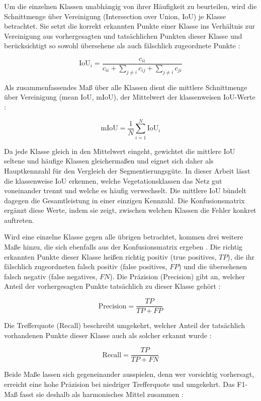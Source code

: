 Um die einzelnen Klassen unabhängig von ihrer Häufigkeit zu beurteilen, wird die Schnittmenge über Vereinigung (Intersection over Union, IoU) je Klasse betrachtet. Sie setzt die korrekt erkannten Punkte einer Klasse ins Verhältnis zur Vereinigung aus vorhergesagten und tatsächlichen Punkten dieser Klasse und berücksichtigt so sowohl übersehene als auch fälschlich zugeordnete Punkte \cite{Diab.2022}:

\[
    \mathrm{IoU}_i = \frac{c_{ii}}{c_{ii} + \sum_{j \neq i} c_{ij} + \sum_{j \neq i} c_{ji}}
\]

Als zusammenfassendes Maß über alle Klassen dient die mittlere Schnittmenge über Vereinigung (mean IoU, mIoU), der Mittelwert der klassenweisen IoU-Werte \cite{Diab.2022}:

\[
    \mathrm{mIoU} = \frac{1}{N} \sum_{i=1}^{N} \mathrm{IoU}_i
\]

Da jede Klasse gleich in den Mittelwert eingeht, gewichtet die mittlere IoU seltene und häufige Klassen gleichermaßen und eignet sich daher als Hauptkennzahl für den Vergleich der Segmentierungsgüte. In dieser Arbeit lässt die klassenweise IoU erkennen, welche Vegetationsklassen das Netz gut voneinander trennt und welche es häufig verwechselt. Die mittlere IoU bündelt dagegen die Gesamtleistung in einer einzigen Kennzahl. Die Konfusionsmatrix ergänzt diese Werte, indem sie zeigt, zwischen welchen Klassen die Fehler konkret auftreten.

Wird eine einzelne Klasse gegen alle übrigen betrachtet, kommen drei weitere Maße hinzu, die sich ebenfalls aus der Konfusionsmatrix ergeben \cite{Diab.2022}. Die richtig erkannten Punkte dieser Klasse heißen richtig positiv (true positives, $TP$), die ihr fälschlich zugeordneten falsch positiv (false positives, $FP$) und die übersehenen falsch negativ (false negatives, $FN$). Die Präzision (Precision) gibt an, welcher Anteil der vorhergesagten Punkte tatsächlich zu dieser Klasse gehört \cite{Diab.2022}:

\[
    \mathrm{Precision} = \frac{TP}{TP + FP}
\]

Die Trefferquote (Recall) beschreibt umgekehrt, welcher Anteil der tatsächlich vorhandenen Punkte dieser Klasse auch als solcher erkannt wurde \cite{Diab.2022}:

\[
    \mathrm{Recall} = \frac{TP}{TP + FN}
\]

Beide Maße lassen sich gegeneinander ausspielen, denn wer vorsichtig vorhersagt, erreicht eine hohe Präzision bei niedriger Trefferquote und umgekehrt. Das F1-Maß fasst sie deshalb als harmonisches Mittel zusammen \cite{Diab.2022}:

